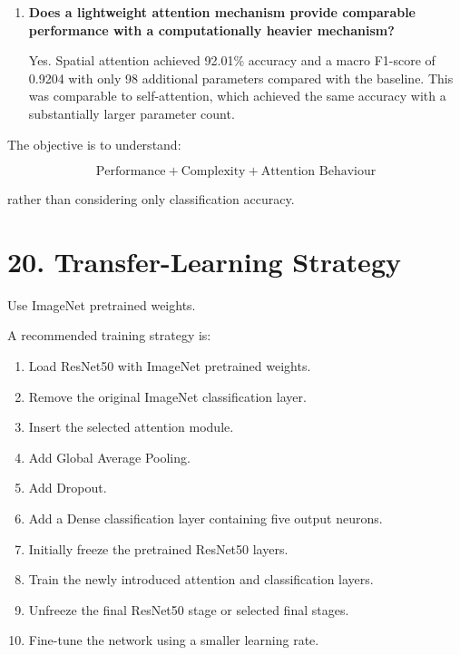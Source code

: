 \documentclass[10pt]{article}
\begin{document}
\begin{enumerate}
No. Self-attention used more parameters than spatial attention
but achieved a slightly lower macro F1-score. CBAM also had
more parameters than the baseline but achieved lower accuracy
in this experiment.

\item \textbf{Does a lightweight attention mechanism provide comparable performance with a computationally heavier mechanism?}

Yes. Spatial attention achieved 92.01\% accuracy and a macro
F1-score of 0.9204 with only 98 additional parameters compared
with the baseline. This was comparable to self-attention,
which achieved the same accuracy with a substantially larger
parameter count.

\end{enumerate}

The objective is to understand:

\[
\boxed{
\text{Performance}
+
\text{Complexity}
+
\text{Attention Behaviour}
}
\]

rather than considering only classification accuracy.




\section*{20. Transfer-Learning Strategy}

Use ImageNet pretrained weights.

A recommended training strategy is:

\begin{enumerate}

\item Load ResNet50 with ImageNet pretrained weights.

\item Remove the original ImageNet classification layer.

\item Insert the selected attention module.

\item Add Global Average Pooling.

\item Add Dropout.

\item Add a Dense classification layer containing five output neurons.

\item Initially freeze the pretrained ResNet50 layers.

\item Train the newly introduced attention and classification layers.

\item Unfreeze the final ResNet50 stage or selected final stages.

\item Fine-tune the network using a smaller learning rate.

\end{enumerate}
\end{document}
